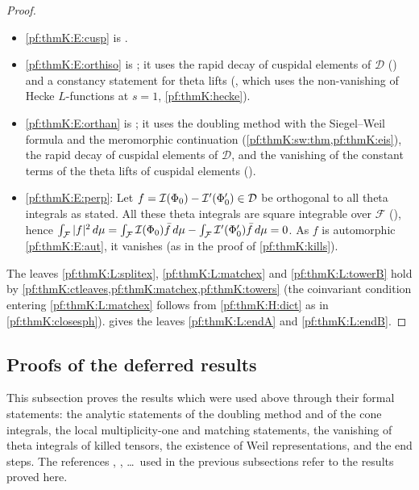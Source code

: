 \begin{proof}
\begin{itemize}
(\cref{pf:thmK:conefac}) and a vanishing statement for real theta lifts
(); the fourth combines the moderate growth of elements of $\mathcal D$
with the existence of splittings along a second plane ().
\item \ref{pf:thmK:E:cusp} is .
\item \ref{pf:thmK:E:orthiso} is ; it uses the rapid decay of cuspidal
elements of $\mathcal D$ () and a constancy statement for theta lifts
(, which uses the non-vanishing of Hecke $L$-functions at $s=1$,
\cref{pf:thmK:hecke}).
\item \ref{pf:thmK:E:orthan} is ; it uses the doubling method with the
Siegel--Weil formula and the meromorphic continuation (\cref{pf:thmK:sw:thm,pf:thmK:eis}), the rapid decay of cuspidal
elements of $\mathcal D$, and the vanishing of the constant terms of the theta lifts of cuspidal elements
().
\item \ref{pf:thmK:E:perp}: Let $f=\mathcal{I}(\Phi_0)-\mathcal{I}'(\Phi'_0)\in\mathcal D$ be orthogonal to all theta integrals as
stated. All these theta integrals are square integrable over $\mathcal F$
(), hence
$\int_{\mathcal F}|f|^2\,d\mu=\int_{\mathcal F}\mathcal{I}(\Phi_0)\bar f\,d\mu-\int_{\mathcal F}\mathcal{I}'(\Phi'_0)\bar f\,d\mu=0$.
As $f$ is automorphic \ref{pf:thmK:E:aut}, it vanishes (as in the proof of \cref{pf:thmK:kills}).
\end{itemize}
The leaves \ref{pf:thmK:L:splitex}, \ref{pf:thmK:L:matchex} and \ref{pf:thmK:L:towerB} hold by
\cref{pf:thmK:ctleaves,pf:thmK:matchex,pf:thmK:towers} (the coinvariant condition entering \ref{pf:thmK:L:matchex} follows from
\ref{pf:thmK:H:dict} as in \cref{pf:thmK:closesph}).  gives the leaves \ref{pf:thmK:L:endA} and
\ref{pf:thmK:L:endB}.
\end{proof}

\subsection{Proofs of the deferred results}\label{sec:pf:thmK:deferred}
This subsection proves the results which were used above through their formal statements: the analytic statements of the
doubling method and of the cone integrals, the local multiplicity-one and matching statements, the vanishing of theta
integrals of killed tensors, the existence of Weil representations, and the end steps. The references
, , \dots\ used in the previous
subsections refer to the results proved here.

